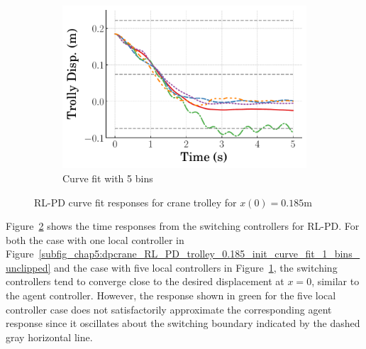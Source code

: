 \begin{figure}
    \hfill
    \begin{subfigure}[b]{0.32\textwidth}
        \centering
        \includegraphics[width=\textwidth]{figures/figures_Interpretability/Mean_ISE_dpcrane_cubic_5_bins/curve_fit_time_responses/RL_PD/curve_fit_0p18_Trolly_Disp.pdf} 
        \caption{Curve fit with 5 bins}
        \label{subfig_chap5:dpcrane_RL_PD_trolley_0.185_init_curve_fit_5_bins_unclipped}
    \end{subfigure}
    \hfill
    \caption{RL-PD curve fit responses for crane trolley for $x(0)=0.185\si{\meter}$}
    \label{fig_chap5:dpcrane_RL_PD_trolley_0.185_init_unclipped}
\end{figure}
%
Figure~\ref{fig_chap5:dpcrane_RL_PD_trolley_0.185_init_unclipped} shows the time responses from the switching controllers for RL-PD. For both the case with one local controller in Figure~\ref{subfig_chap5:dpcrane_RL_PD_trolley_0.185_init_curve_fit_1_bins_unclipped} and the case with five local controllers in Figure~\ref{subfig_chap5:dpcrane_RL_PD_trolley_0.185_init_curve_fit_5_bins_unclipped}, the switching controllers tend to converge close to the desired displacement at $x=0$, similar to the agent controller. However, the response shown in green for the five local controller case does not satisfactorily approximate the corresponding agent response since
it oscillates about the switching boundary indicated by the dashed gray horizontal line.

